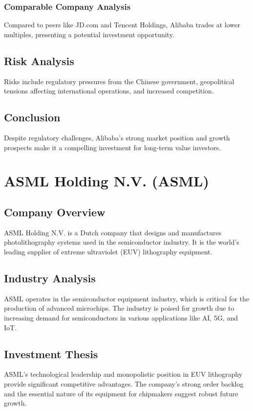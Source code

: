 \documentclass[12pt]{report}
\begin{document}
\subsection{Comparable Company Analysis}
Compared to peers like JD.com and Tencent Holdings, Alibaba trades at lower multiples, presenting a potential investment opportunity.

\section{Risk Analysis}
Risks include regulatory pressures from the Chinese government, geopolitical tensions affecting international operations, and increased competition.

\section{Conclusion}
Despite regulatory challenges, Alibaba's strong market position and growth prospects make it a compelling investment for long-term value investors.

\chapter{ASML Holding N.V. (ASML)}
\section{Company Overview}
ASML Holding N.V. is a Dutch company that designs and manufactures photolithography systems used in the semiconductor industry. It is the world's leading supplier of extreme ultraviolet (EUV) lithography equipment.

\section{Industry Analysis}
ASML operates in the semiconductor equipment industry, which is critical for the production of advanced microchips. The industry is poised for growth due to increasing demand for semiconductors in various applications like AI, 5G, and IoT.

\section{Investment Thesis}
ASML's technological leadership and monopolistic position in EUV lithography provide significant competitive advantages. The company's strong order backlog and the essential nature of its equipment for chipmakers suggest robust future growth.
\end{document}
